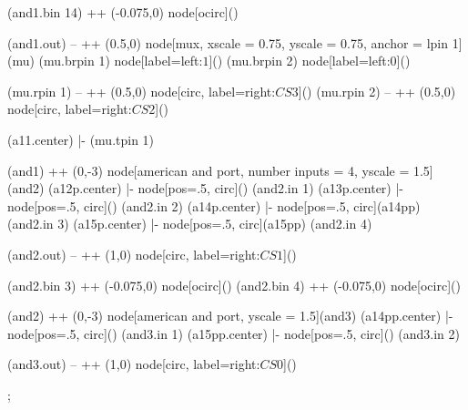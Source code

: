 \begin{page}
\begin{circuitikz}
		(and1.bin 14) ++ (-0.075,0) node[ocirc](){}
		
	
		(and1.out) -- ++ (0.5,0) node[mux, xscale = 0.75, yscale = 0.75, anchor = lpin 1](mu){}
		(mu.brpin 1) node[label=left:$1$](){}
		(mu.brpin 2) node[label=left:$0$](){}
		
		(mu.rpin 1) -- ++ (0.5,0) node[circ, label=right:$CS3$](){}
		(mu.rpin 2) -- ++ (0.5,0) node[circ, label=right:$CS2$](){}
		
		(a11.center) |- (mu.tpin 1)
		
		
		(and1) ++ (0,-3) node[american and port, number inputs = 4, yscale = 1.5](and2){}
		(a12p.center) |- node[pos=.5, circ](){} (and2.in 1)
		(a13p.center) |- node[pos=.5, circ](){} (and2.in 2)
		(a14p.center) |- node[pos=.5, circ](a14pp){} (and2.in 3)
		(a15p.center) |- node[pos=.5, circ](a15pp){} (and2.in 4)
		
		(and2.out) -- ++ (1,0) node[circ, label=right:$CS1$](){}
		
		(and2.bin 3) ++ (-0.075,0) node[ocirc](){}
		(and2.bin 4) ++ (-0.075,0) node[ocirc](){}
		
		(and2) ++ (0,-3) node[american and port, yscale = 1.5](and3){}
		(a14pp.center) |- node[pos=.5, circ](){} (and3.in 1)
		(a15pp.center) |- node[pos=.5, circ](){} (and3.in 2)
		
		(and3.out) -- ++ (1,0) node[circ, label=right:$CS0$](){}
		
		
		
		
		

		
		
		
			
		
	;

%	

\end{circuitikz}
\end{page}





